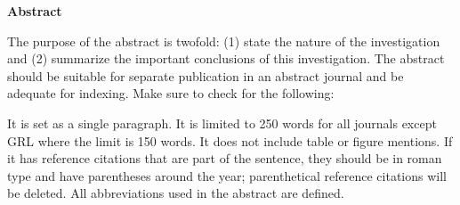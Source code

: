 \textbf{Abstract}

The purpose of the abstract is twofold: (1) state the nature of the investigation and (2) summarize the important conclusions of this investigation. The abstract should be suitable for separate publication in an abstract journal and be adequate for indexing. Make sure to check for the following:

    It is set as a single paragraph.
    It is limited to 250 words for all journals except GRL where the limit is 150 words.
    It does not include table or figure mentions.
    If it has reference citations that are part of the sentence, they should be in roman type and have parentheses around the year; parenthetical reference citations will be deleted.
    All abbreviations used in the abstract are defined.

  